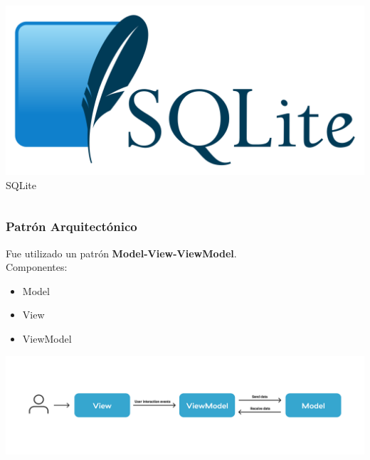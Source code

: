 \documentclass[14pt]{beamer}
\begin{document}
\begin{frame}
\begin{columns}
\begin{column}{0.3\textwidth}
\begin{center}
\includegraphics[scale =0.08]{Images/LogodeSQLite.png}\\
\caption{SQLite}
\end{center}
\end{column}
\end{columns}


\end{frame}


\begin{frame}
\frametitle{Patrón Arquitectónico}

Fue utilizado un patrón \textbf{Model-View-ViewModel}.
\\
Componentes:
\begin{itemize}
\item Model
\item View
\item ViewModel
\end{itemize}

\begin{center}

\includegraphics[scale =0.2]{Images/MVVMwip.png}


\end{center}

\end{frame}
\end{document}
